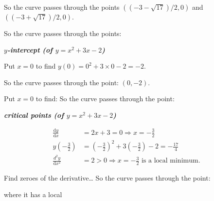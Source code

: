 \documentclass[
  english,
  11pt,
  oneside]{book}
\newcommand{\slide}{}
\theoremstyle{definition}
\theoremstyle{definition}
\theoremstyle{definition}
\theoremstyle{definition}
\theoremstyle{remark}
\begin{document}
\begin{notslides}

So the curve passes through the points \(((-3-\sqrt{17})/2,0)\) and \(((-3+\sqrt{17})/2,0)\).

\end{notslides}

\begin{slidesonly}

So the curve passes through the points:

\end{slidesonly}

\slide

\textbf{\emph{\(y\)-intercept (of \(y = x^2+3x-2\))}}

\begin{notslides}

Put \(x=0\) to find \(y(0) = 0^2+3\times0-2 = -2\).

So the curve passes through the point: \((0,-2)\).

\end{notslides}

\begin{slidesonly}

Put \(x=0\) to find:
\vfill
So the curve passes through the point:

\end{slidesonly}

\slide

\textbf{\emph{critical points (of \(y = x^2+3x-2\))}}

\begin{notslides}

\begin{align*}
\frac{\mathrm{d} y}{\mathrm{d} x} &= 2x+3 = 0 \Rightarrow x = -\frac{3}{2}\\
y(-\frac32) &= \left(-\frac32\right)^2 +3\left(-\frac 32\right) - 2 = -\frac{17}4\\
\frac{d^2y}{\mathrm{d} x^2} &= 2>0\Rightarrow x=-\frac 32\text{ is a local minimum}.
\end{align*}

\end{notslides}

\begin{slidesonly}

Find zeroes of the derivative\ldots{}
\vfill
So the curve passes through the point:

where it has a local

\end{slidesonly}
\end{document}
